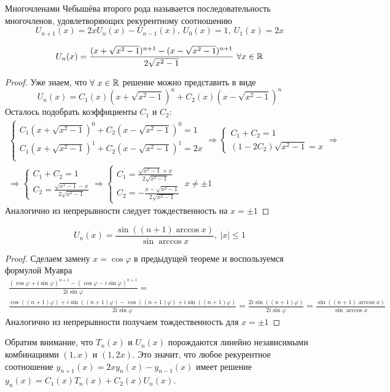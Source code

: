\begin{definition}
  Многочленами Чебышёва второго рода называется последовательность
  многочленов, удовлетворяющих рекурентному соотношению
  \[U_{n+1}(x)=2xU_n(x)-U_{n-1}(x),\ U_0(x)=1,\ U_1(x)=2x\]
\end{definition}
\begin{theorem}
  \[U_n(x)=\frac{(x+\sqrt{x^2-1})^{n+1}-(x-\sqrt{x^2-1})^{n+1}}{2\sqrt{x^2-1}}\ \forall x\in\R\]
\end{theorem}
\begin{proof}
  Уже знаем, что $\forall\ x\in\R$ решение можно представить в виде
  \[U_n(x)=C_1(x)(x+\sqrt{x^2-1})^n+C_2(x)(x-\sqrt{x^2-1})^n\]
  Осталось подобрать коэффициенты $C_1$ и $C_2$:
  \begin{multline*}
    \begin{cases}
      C_1(x+\sqrt{x^2-1})^0+C_2(x-\sqrt{x^2-1})^0=1  \\
      C_1(x+\sqrt{x^2-1})^1+C_2(x-\sqrt{x^2-1})^1=2x \\
    \end{cases}\Rightarrow\begin{cases}
      C_1+C_2=1 \\
      (1-2C_2)\sqrt{x^2-1}=x
    \end{cases}\Rightarrow \\ \Rightarrow\begin{cases}
      C_1+C_2=1 \\
      C_2=\frac{\sqrt{x^2-1} - x}{2\sqrt{x^2-1}}
    \end{cases}\Rightarrow \begin{cases}
      C_1=\frac{\sqrt{x^2-1} + x}{2\sqrt{x^2-1}} \\
      C_2=-\frac{x-\sqrt{x^2-1}}{2\sqrt{x^2-1}}
    \end{cases}\ x\neq\pm1
  \end{multline*}
  Аналогично из непрерывности следует тождественность на $x=\pm1$
\end{proof}

\begin{theorem}
  \[U_n(x)=\frac{\sin((n+1)\arccos{x})}{\sin\arccos{x}},\ |x|\leq1\]
\end{theorem}
\begin{proof}
  Сделаем замену $x=\cos\varphi$ в предыдущей теореме и воспользуемся формулой Муавра
  \begin{multline*}
    \frac{(\cos\varphi+i\sin\varphi)^{n+1}-(\cos\varphi-i\sin\varphi)^{n+1}}{2i\sin\varphi}= \\
    \frac{\cos((n+1)\varphi)+i\sin((n+1)\varphi)-\cos((n+1)\varphi)+i\sin((n+1)\varphi)}{2i\sin\varphi}= \frac{2i\sin((n+1)\varphi)}{2i\sin\varphi}=\frac{\sin((n+1)\arccos{x})}{\sin\arccos{x}}
  \end{multline*}
  Аналогично из непрерывности получаем тождественность для $x=\pm1$
\end{proof}
\begin{remark*}
  Обратим внимание, что $T_n(x)$ и $U_n(x)$ порождаются линейно независимыми
  комбинациями $(1,x)$ и $(1,2x)$. Это значит, что любое рекурентное
  соотношение $y_{n+1}(x)=2xy_n(x)-y_{n-1}(x)$ имеет решение
  $y_{n}(x)=C_1(x)T_n(x)+C_2(x)U_n(x)$.
\end{remark*}
